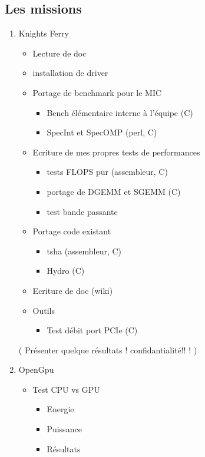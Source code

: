 \documentclass{article}
\begin{document}
		\subsection{Les missions}
			\begin{enumerate}
			\item Knights Ferry
				\begin{itemize}
				\item Lecture de doc
				\item installation de driver
				\item Portage de benchmark pour le MIC
					\begin{itemize}
					\item Bench élémentaire interne à l'équipe (C)
					\item SpecInt et SpecOMP (perl, C)
					\end{itemize}
				\item Ecriture de mes propres tests de performances
					\begin{itemize}
					\item tests FLOPS pur (assembleur, C)
					\item portage de DGEMM et SGEMM (C)
					\item test bande passante
					\end{itemize}
				\item Portage code existant
					\begin{itemize}
					\item tsha (assembleur, C)
					\item Hydro (C)
					\end{itemize}
				\item Ecriture de doc (wiki)
				\item Outils
					\begin{itemize}
					\item Test débit port PCIe (C)
					\end{itemize}
				\end{itemize}
				( Présenter quelque résultats ! confidantialité!! ! )
			\item OpenGpu
				\begin{itemize}
				\item Test CPU vs GPU
					\begin{itemize}
					\item Energie
					\item Puissance
					\item Résultats
					\end{itemize}
				\end{itemize}

\end{enumerate}
\end{document}
